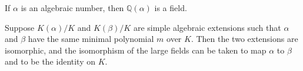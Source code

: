 \begin{corollary}
	If \(\alpha\) is an algebraic number, then \(\mathbb{Q}(\alpha)\) is a field.
\end{corollary}

\begin{corollary} \label{thm:minimal-polynomial-roots-isomorphic}
    Suppose $K(\alpha) / K$ and $K(\beta) / K$ are simple algebraic extensions such that $\alpha$ and $\beta$ have the same minimal polynomial $m$ over $K$. Then the two extensions are isomorphic, and the isomorphism of the large fields can be taken to map $\alpha$ to $\beta$ and to be the identity on $K$.
\end{corollary}




